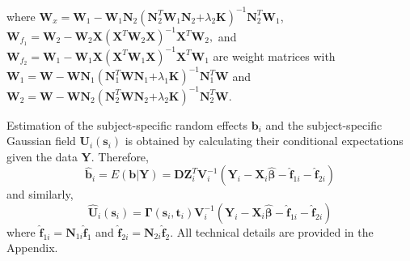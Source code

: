 \documentclass[article,lineno]{biometrika}
\begin{document}
where 
$ \boldsymbol W_x =
 \boldsymbol W_1 
 -
\boldsymbol W_1 \boldsymbol N_2 
 (\boldsymbol N_2^T  \boldsymbol W_1 \boldsymbol N_2 \boldsymbol 
 + \lambda_2 \boldsymbol K)^{-1} 
 \boldsymbol N_2^T  \boldsymbol W_1$, 
 $\boldsymbol W_{f_1}  =  \boldsymbol W_2 - \boldsymbol W_2\boldsymbol X(\boldsymbol X^T  \boldsymbol W_2\boldsymbol X)^{-1}  \boldsymbol X^T  \boldsymbol W_2,$
 and 
 $\boldsymbol W_{f_2}  =  \boldsymbol W_1 - \boldsymbol W_1\boldsymbol X(\boldsymbol X^T  \boldsymbol W_1\boldsymbol X)^{-1}  \boldsymbol X^T  \boldsymbol W_1$ are weight matrices
 with
 $ \boldsymbol W_1 =
 \boldsymbol W 
 -
\boldsymbol W \boldsymbol N_1 
 (\boldsymbol N_1^T  \boldsymbol W \boldsymbol N_1 \boldsymbol 
 + \lambda_1 \boldsymbol K)^{-1} 
 \boldsymbol N_1^T  \boldsymbol W$
 and
 $ \boldsymbol W_2 =
 \boldsymbol W 
 -
\boldsymbol W \boldsymbol N_2 
 (\boldsymbol N_2^T  \boldsymbol W \boldsymbol N_2 \boldsymbol 
 + \lambda_2 \boldsymbol K)^{-1} 
 \boldsymbol N_2^T  \boldsymbol W$.

Estimation of the subject-specific random effects $\boldsymbol b_i$ and the subject-specific Gaussian field $\boldsymbol U_i(\boldsymbol s_i)$ is obtained by calculating their conditional expectations given the data $\boldsymbol Y$.
Therefore,
\begin{equation}\label{bHat}
\boldsymbol {\hat b}_i = E(\boldsymbol b | \boldsymbol Y)
=  \boldsymbol D \boldsymbol Z_i^T   \boldsymbol V_i^{-1} 
(\boldsymbol Y_i - \boldsymbol X_i\boldsymbol{\hat \beta} -
 \boldsymbol {\hat f}_{1i} -
\boldsymbol {\hat f}_{2i})
\end{equation}
and similarly,   
\begin{equation}\label{uHat}
\bm {\hat U}_i(\bm s_i)
=
\bm \Gamma(\bm s_i, \bm t_i) \bm V_i^{-1}
(\boldsymbol Y_i - \boldsymbol X_i\boldsymbol{\hat \beta} -
 \boldsymbol {\hat f}_{1i} -
\boldsymbol {\hat f}_{2i})
\end{equation}
where $\boldsymbol {\hat f}_{1i} =  \boldsymbol N_{1i} \boldsymbol {\hat f}_1$
and 
$\boldsymbol {\hat f}_{2i} =  \boldsymbol N_{2i} \boldsymbol {\hat f}_2$. All technical details are provided in the Appendix.
\end{document}
